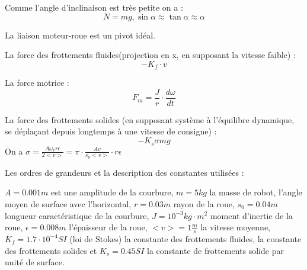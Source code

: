\documentclass[11pt]{article} %
\begin{document}
Comme l'angle d'inclinaison est très petite on a : \begin{equation} N = mg , \sin \alpha \approx \tan \alpha \approx \alpha\end{equation} 

La liaison moteur-roue est un pivot idéal.

La force des frottements fluides(projection en x, en supposant la vitesse faible) : \begin{equation} -K_f \cdot v \end{equation}

La force motrice : \begin{equation} F_m = \frac{J}{r} \cdot \frac{d\omega}{dt}\end{equation} 

La force des frottements solides (en supposant système à l'équilibre dynamique, se déplaçant depuis longtemps à une vitesse de consigne) : \begin{equation} -K_s \sigma mg  \end{equation}
On a \begin{math}  \sigma =\frac{A \omega_v r \epsilon}{2<v>} = \pi \cdot \frac{Av}{s_0<v>} \cdot r \epsilon \end{math}

Les ordres de grandeurs et la description des constantes utilisées : 

\begin{math} A = 0.001m \end{math} est une amplitude de la courbure,  \begin{math} m=5kg \end{math} la masse de robot, l'angle moyen de surface avec l'horizontal, \begin{math} r=0.03m \end{math} rayon de la roue, \begin{math} s_0=0.04m \end{math} longueur caractéristique de la courbure, \begin{math} J = 10^{-3} kg \cdot m^2 \end{math} moment d'inertie de la roue, \begin{math} \epsilon  = 0.008m \end{math} l'épaisseur de la roue, \begin{math} <v>=1 \frac{m}{s} \end{math} la vitesse moyenne, \begin{math} K_f = 1.7 \cdot 10^{-4} SI \end{math} (loi de Stokes) la constante des frottements fluides, la constante des frottements solides et \begin{math} K_s = 0.45 SI \end{math} la constante de frottements solide par unité de surface.
\end{document}
